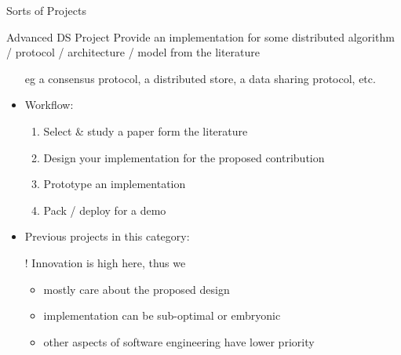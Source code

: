 \documentclass[presentation]{beamer}\mode<presentation>{\usetheme{AMSBolognaFC}}
\begin{document}
\begin{frame}[c, allowframebreaks]{Sorts of Projects}
    \begin{block}{Advanced DS Project}
        Provide an implementation for some distributed algorithm / protocol / architecture / model from the literature
        \begin{itemize}
            \item[eg] a consensus protocol, a distributed store, a data sharing protocol, etc.
            \item Workflow:
            \begin{enumerate}
                \item Select \& study a paper form the literature
                \item Design your implementation for the proposed contribution
                \item Prototype an implementation
                \item Pack / deploy for a demo
            \end{enumerate}
            \item Previous projects in this category: \cite{Sd2021ProjectZyzzyva, Sd2021HybridQuorum}
            \item[!] Innovation is high here, thus we
            \begin{itemize}
                \item mostly care about the proposed design
                \item implementation can be sub-optimal or embryonic
                \item other aspects of software engineering have lower priority
            \end{itemize}
        \end{itemize}
    \end{block}


\end{frame}
\end{document}
